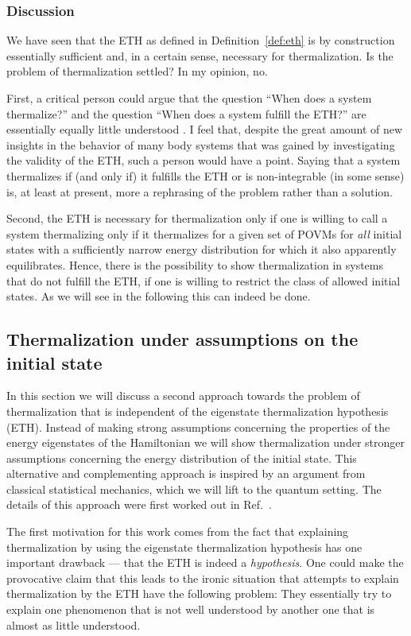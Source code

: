 \documentclass[a4paper,12pt,listof=totoc,index=totoc,bibliography=totoc,headsepline=false,headings=normal,BCOR16.153846mm,DIV12,headinclude,twoside,cleardoublepage=empty,numbers=noenddot,final]{scrreprt}
\theoremstyle{mystyle}
\numberwithin{equation}{section}
\numberwithin{figure}{section}
\numberwithin{lemma}{section}
\numberwithin{theorem}{section}
\numberwithin{corollary}{section}
\numberwithin{definition}{section}
\numberwithin{conjecture}{section}
\numberwithin{observation}{section}
\newcommand{\+}{\mkern2mu}
\DeclareMathOperator{\1}{\mathds{1}}
\begin{document}
\subsubsection*{Discussion}
%
We have seen that the ETH as defined in Definition~\ref{def:eth} is by construction essentially sufficient and, in a certain sense, necessary for thermalization.
Is the problem of thermalization settled?
In my opinion, no.

First, a critical person could argue that the question ``When does a system thermalize?'' and the question ``When does a system fulfill the ETH?'' are essentially equally little understood \cite{Singh}.
I feel that, despite the great amount of new insights in the behavior of many body systems that was gained by investigating the validity of the ETH, such a person would have a point.
Saying that a system thermalizes if (and only if) it fulfills the ETH or is non-integrable (in some sense) is, at least at present, more a rephrasing of the problem rather than a solution.

Second, the ETH is necessary for thermalization only if one is willing to call a system thermalizing only if it thermalizes for a given set of POVMs for \emph{all} initial states with a sufficiently narrow energy distribution for which it also apparently equilibrates.
Hence, there is the possibility to show thermalization in systems that do not fulfill the ETH, if one is willing to restrict the class of allowed initial states.
As we will see in the following this can indeed be done.


\subsection{Thermalization under assumptions on the initial state}
\label{sec:thermalizationunderassumptionsontheinitialstate}
%
In this section we will discuss a second approach towards the problem of thermalization that is independent of the eigenstate thermalization hypothesis (ETH).
Instead of making strong assumptions concerning the properties of the energy eigenstates of the Hamiltonian we will show thermalization under stronger assumptions concerning the energy distribution of the initial state.
This alternative and complementing approach is inspired by an argument from classical statistical mechanics, which we will lift to the quantum setting.
The details of this approach were first worked out in Ref.~\cite{Riera2012}.

The first motivation for this work comes from the fact that explaining thermalization by using the eigenstate thermalization hypothesis has one important drawback --- that the ETH is indeed a \emph{hypothesis}.
One could make the provocative claim that this leads to the ironic situation that attempts to explain thermalization by the ETH have the following problem:
They essentially try to explain one phenomenon that is not well understood by another one that is almost as little understood.
\end{document}
